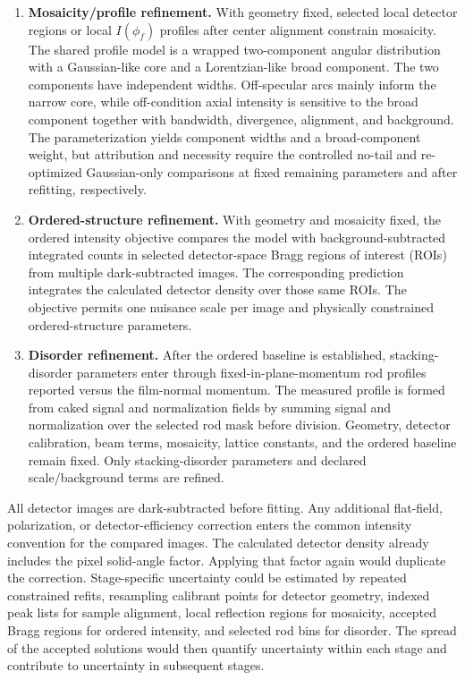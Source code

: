 \begin{enumerate}
  \item \textbf{Mosaicity/profile refinement.}
  With geometry fixed, selected local detector regions or local $I(\phi_f)$ profiles after center alignment constrain mosaicity. The shared profile model is a wrapped two-component angular distribution with a Gaussian-like core and a Lorentzian-like broad component. The two components have independent widths. Off-specular arcs mainly inform the narrow core, while off-condition axial intensity is sensitive to the broad component together with bandwidth, divergence, alignment, and background. The parameterization yields component widths and a broad-component weight, but attribution and necessity require the controlled no-tail and re-optimized Gaussian-only comparisons at fixed remaining parameters and after refitting, respectively.

  \item \textbf{Ordered-structure refinement.}
  With geometry and mosaicity fixed, the ordered intensity objective compares the model with background-subtracted integrated counts in selected detector-space Bragg regions of interest (ROIs) from multiple dark-subtracted images. The corresponding prediction integrates the calculated detector density over those same ROIs. The objective permits one nuisance scale per image and physically constrained ordered-structure parameters.

  \item \textbf{Disorder refinement.}
  After the ordered baseline is established, stacking-disorder parameters enter through fixed-in-plane-momentum rod profiles reported versus the film-normal momentum. The measured profile is formed from caked signal and normalization fields by summing signal and normalization over the selected rod mask before division. Geometry, detector calibration, beam terms, mosaicity, lattice constants, and the ordered baseline remain fixed. Only stacking-disorder parameters and declared scale/background terms are refined.
\end{enumerate}

All detector images are dark-subtracted before fitting. Any additional flat-field, polarization, or detector-efficiency correction enters the common intensity convention for the compared images. The calculated detector density already includes the pixel solid-angle factor. Applying that factor again would duplicate the correction. Stage-specific uncertainty could be estimated by repeated constrained refits, resampling calibrant points for detector geometry, indexed peak lists for sample alignment, local reflection regions for mosaicity, accepted Bragg regions for ordered intensity, and selected rod bins for disorder. The spread of the accepted solutions would then quantify uncertainty within each stage and contribute to uncertainty in subsequent stages.

